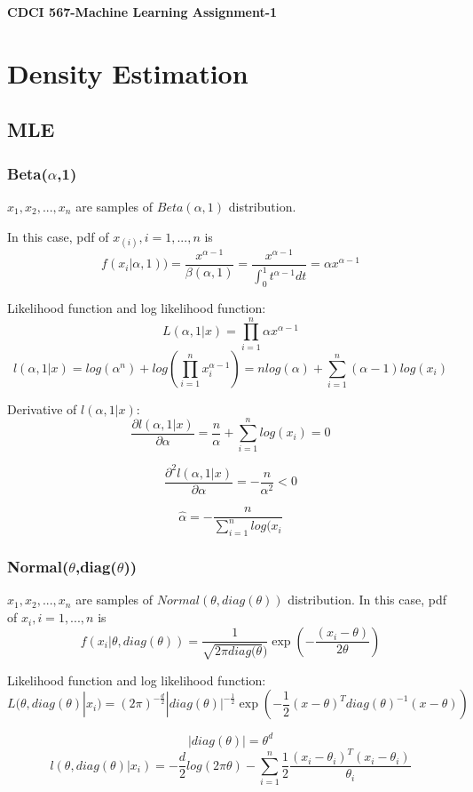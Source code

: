 \documentclass[11pt]{article}
\begin{document}
	\begin{center}
		\Large\textbf{CDCI 567-Machine Learning Assignment-1}
	\end{center}
	\section{Density Estimation}
	\subsection{MLE}
	\subsubsection{Beta($\alpha$,1)}
	$x_{1},x_{2},...,x_{n}$ are samples of $Beta(\alpha,1)$ distribution.
	
	In this case, pdf of $x_(i), i=1,...,n$ is $$f(x_{i}|\alpha,1))=\frac{x^{\alpha-1}}{\beta(\alpha,1)}=
	\frac{x^{\alpha-1}}{\int_{0}^{1}t^{\alpha-1}dt}=
	\alpha x^{\alpha-1}$$
	
	Likelihood function and log likelihood function:
	$$L(\alpha,1|x)=\prod_{i=1}^{n}\alpha x^{\alpha-1}$$
	$$l(\alpha,1|x)=log(\alpha^{n}) + log(\prod_{i=1}^{n}x_{i}^{\alpha-1})=
	nlog(\alpha) + \sum_{i=1}^{n}(\alpha-1)log(x_{i})$$
	
	Derivative of $l(\alpha,1|x)$:
	$$\frac{\partial l(\alpha,1|x)}{\partial \alpha} = \frac{n}{\alpha} + \sum_{i=1}^{n}log(x_{i})=0$$
	
	$$\frac{\partial^{2} l(\alpha,1|x)}{\partial \alpha} = -\frac{n}{\alpha^{2}} < 0$$
	
	$$\hat{\alpha} = -\frac{n}{\sum_{i=1}^{n}log(x_{i}}$$
	\subsubsection{Normal($\theta$,diag($\theta$))}
	$x_{1},x_{2},...,x_{n}$ are samples of $Normal(\theta,diag(\theta))$ distribution.
	In this case, pdf of $x_{i}, i = 1,...,n$ is
	$$f(x_{i}|\theta,diag(\theta)) = \frac{1}{\sqrt{2\pi diag(\theta})}\exp(-\frac{(x_{i}-\theta)}{2\theta})$$
	
	Likelihood function and log likelihood function:
	$$L(\theta,diag(\theta)|x_{i}) = (2\pi)^{-\frac{d}{2}}|diag(\theta)|^{-\frac{1}{2}}\exp(-\frac{1}{2}(x-\theta)^{T}diag(\theta)^{-1}(x-\theta))$$	
	
	$$|diag(\theta)| = \theta^{d}$$
	$$l(\theta,diag(\theta)|x_{i}) = -\frac{d}{2}log(2\pi\theta) - \sum_{i=1}^{n}\frac{1}{2} \frac{(x_{i}-\theta_{i})^{T}(x_{i}-\theta_{i})}{\theta_{i}}$$
	
\end{document}
